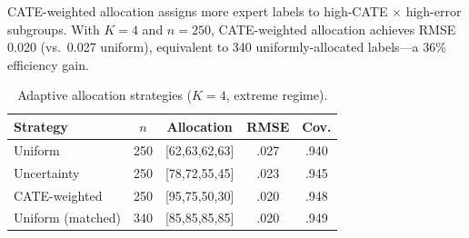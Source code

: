 \documentclass[11pt,a4paper]{article}
\begin{document}
CATE-weighted allocation assigns more expert labels to high-CATE $\times$ high-error subgroups. With $K=4$ and $n=250$, CATE-weighted allocation achieves RMSE 0.020 (vs.\ 0.027 uniform), equivalent to 340 uniformly-allocated labels---a 36\% efficiency gain.

\begin{table}[h]
\centering
\small
\setlength{\tabcolsep}{3pt}
\begin{tabular}{lcccc}
\toprule
Strategy & $n$ & Allocation & RMSE & Cov. \\
\midrule
Uniform & 250 & [62,63,62,63] & .027 & .940 \\
Uncertainty & 250 & [78,72,55,45] & .023 & .945 \\
CATE-weighted & 250 & [95,75,50,30] & .020 & .948 \\
Uniform (matched) & 340 & [85,85,85,85] & .020 & .949 \\
\bottomrule
\end{tabular}
\caption{Adaptive allocation strategies ($K=4$, extreme regime).}
\label{tab:adaptive}
\end{table}
\end{document}
